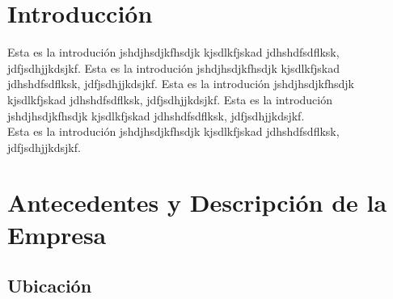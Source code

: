 \documentclass[12pt,letterpaper,spanish, xcolor=table]{report}
\begin{document}


\tableofcontents




\oddsidemargin 0.2in \textwidth 6.5in \topmargin -0.25in
\textheight 9in \pagestyle{myheadings}
	
	
\newpage



\chapter{Introducción}
\newpage


Esta es la introdución jshdjhsdjkfhsdjk kjsdlkfjskad jdhshdfsdflksk, jdfjsdhjjkdsjkf.
Esta es la introdución jshdjhsdjkfhsdjk kjsdlkfjskad jdhshdfsdflksk, jdfjsdhjjkdsjkf.
Esta es la introdución jshdjhsdjkfhsdjk kjsdlkfjskad jdhshdfsdflksk, jdfjsdhjjkdsjkf.
Esta es la introdución jshdjhsdjkfhsdjk kjsdlkfjskad jdhshdfsdflksk, jdfjsdhjjkdsjkf.
\\

Esta es la introdución jshdjhsdjkfhsdjk kjsdlkfjskad jdhshdfsdflksk, jdfjsdhjjkdsjkf.


\chapter{Antecedentes y Descripción de la Empresa}
\newpage



\section{Ubicación}
	
\end{document}
